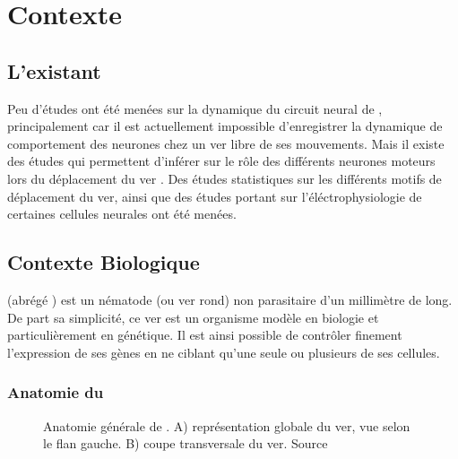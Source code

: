 \chapter{Contexte} %
\label{cha:Contexte}

\section{L'existant} %
\label{sec:L'existant}

Peu d'études ont été menées sur la dynamique du circuit neural de \celeg{},
principalement car il est actuellement impossible d'enregistrer la dynamique de
comportement des neurones chez un ver libre de ses mouvements.  Mais il existe
des études qui permettent d'inférer sur le rôle des différents neurones moteurs
lors du déplacement du ver \cite{Yanik2006,Chronis2007,Leifer2011}.  Des études
statistiques sur les différents motifs de déplacement \cite{Gray2005} du ver,
ainsi que des études portant sur l'éléctrophysiologie de certaines cellules
neurales \cite{Mellem2008a,Lockery2009} ont été menées.


\section{Contexte Biologique} %
\label{sec:Contexte Biologique}

\caeleg{} (abrégé \celeg{}) est un nématode (ou ver rond) non parasitaire d'un
millimètre de long. De part sa simplicité, ce ver est un organisme modèle en biologie
et particulièrement en génétique. Il est ainsi possible de contrôler
finement l'expression de ses gènes en ne ciblant qu'une seule ou plusieurs de
ses cellules.

\subsection{Anatomie du \celeg{}} %
\label{sub:Anatomie du caeleg}

\begin{figure}[ht]
   \begin{center}
   \end{center}
   \caption{Anatomie générale de \caeleg{}. A) représentation globale du ver,
   vue selon le flan gauche. B) coupe transversale du ver. Source
   \cite{Boyle2009}}
   \label{fig:celegans_anatomy}
\end{figure}


